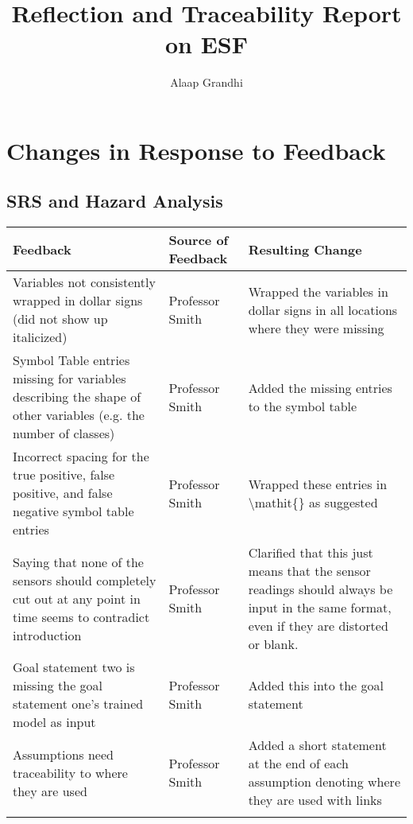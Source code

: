 \documentclass{article}
\title{Reflection and Traceability Report on ESF}
\author{Alaap Grandhi}
\date{}
\begin{document}
\maketitle

\newpage

\section{Changes in Response to Feedback}

\subsection{SRS and Hazard Analysis}

\begin{longtable}{p{5cm}p{4cm}p{5cm}}\toprule
    Feedback & Source of Feedback & Resulting Change \\\midrule
    Variables not consistently wrapped in dollar signs (did not show up italicized) & Professor Smith & Wrapped the variables in dollar signs in all locations where they were missing \\ 
    \addlinespace[0.5cm]
    
    Symbol Table entries missing for variables describing the shape of other variables (e.g. the number of classes) & Professor Smith & Added the missing entries to the symbol table \\ 
    \addlinespace[0.5cm]
    
    Incorrect spacing for the true positive, false positive, and false negative symbol table entries & Professor Smith & Wrapped these entries in \textbackslash{}mathit\{\} as suggested \\ 
    \addlinespace[0.5cm]
    
    Saying that none of the sensors should completely cut out at any point in time seems to contradict introduction & Professor Smith & Clarified that this just means that the sensor readings should always be input in the same format, even if they are distorted or blank. \\ 
    \addlinespace[0.5cm]
    
    Goal statement two is missing the goal statement one's trained model as input & Professor Smith & Added this into the goal statement \\ 
    \addlinespace[0.5cm]

    Assumptions need traceability to where they are used & Professor Smith & Added a short statement at the end of each assumption denoting where they are used with links \\ 
    \addlinespace[0.5cm]


\end{longtable}
\end{document}
